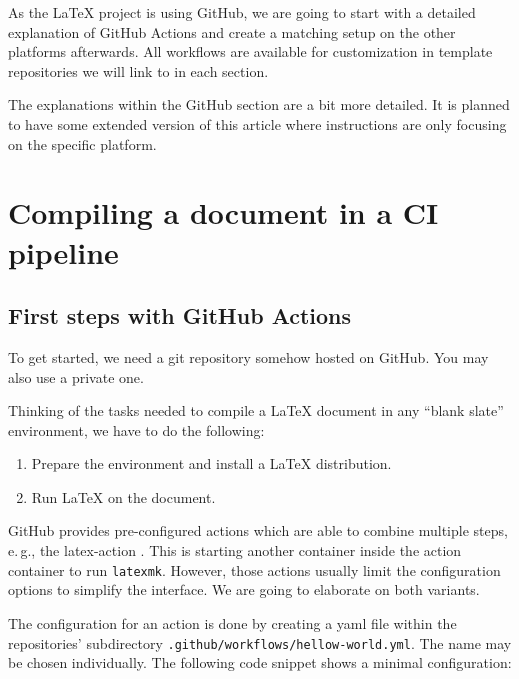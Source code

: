 \documentclass[final]{ltugboat}
\newcommand*{\command}[1]{\texttt{#1}}
\newcommand*{\file}[1]{\texttt{#1}}
\begin{document}
As the \LaTeX{} project is using GitHub, we are going to start with a detailed explanation of GitHub Actions and create a matching setup on the other platforms afterwards.
All workflows are available for customization in template repositories we will link to in each section.

The explanations within the GitHub section are a bit more detailed.
It is planned to have some extended version of this article where instructions are only focusing on the specific platform.

\section{Compiling a document in a CI pipeline}

\subsection{First steps with GitHub Actions}

To get started, we need a git repository somehow hosted on GitHub.
You may also use a private one.

Thinking of the tasks needed to compile a LaTeX document in any “blank slate” environment, we have to do the following:

\begin{enumerate}
\item Prepare the environment and install a \LaTeX{} distribution.
\item Run \LaTeX{} on the document.
\end{enumerate}
%
\noindent GitHub provides pre-configured actions which are able to combine multiple steps, e.\,g., the latex-action \cite{latex-action}.
This  is starting another container inside the action container to run \command{latexmk}.
However, those actions usually limit the configuration options to simplify the interface.
We are going to elaborate on both variants.

The configuration for an action is done by creating a yaml file within the repositories' subdirectory \file{.github/workflows/hellow-world.yml}.
The name may be chosen individually.
The following code snippet shows a minimal configuration:

\inputminted{yaml}{examples/hello-world.yml}
\end{document}
